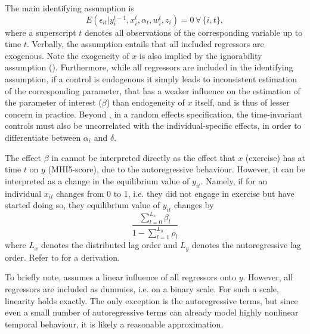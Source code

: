 The main identifying assumption is \cite{moral2019dynamic}
\begin{equation}
    \label{eq:methods:identifying_assumption}
    E(\epsilon_{it} | y_i^{t-1}, x_i^t, \alpha_t, w_{i}^t, z_i) = 0 \,\forall\,\{i,t\},
\end{equation}
where a superscript $t$ denotes all observations of the corresponding variable up to time $t$.
Verbally, the assumption entails that all included regressors are exogenous.
Note the exogeneity of $x$ is also implied by the ignorability assumption ().
Furthermore, while all regressors are included in the identifying assumption, if a control is endogenous it simply
leads to inconsistent estimation of the corresponding parameter, that has a weaker influence on the estimation
of the parameter of interest ($\beta$) than endogeneity of $x$ itself, and is thus of lesser concern in practice.
Beyond , in a random effects specification, the time-invariant controls
must also be uncorrelated with the individual-specific effects, in order to differentiate between $\alpha_i$ and $\delta$.

The effect $\beta$ in  cannot be interpreted directly as the effect that $x$ (exercise)
has at time $t$ on $y$ (MHI5-score), due to the autoregressive behaviour. However, it can be interpreted as a change
in the equilibrium value of $y_{it}$. Namely, if for an individual $x_{it}$ changes from 0 to 1, i.e. they did not
engage in exercise but have started doing so, they equilibrium value of $y_{it}$ changes by
\begin{equation}
    \label{eq:methods:long_run_effect}
    \frac{\sum_{l=0}^{L_x} \beta_l}{1 - \sum_{l=1}^{L_y} \rho_l}
\end{equation}
where $L_x$ denotes the distributed lag order and $L_y$ denotes the autoregressive lag order.
Refer to  for a derivation.

To briefly note,  assumes a linear influence of all regressors onto $y$. However, all regressors
are included as dummies, i.e. on a binary scale. For such a scale, linearity holds exactly.
The only exception is the autoregressive terms, but since even a small number of autoregressive terms can already
model highly nonlinear temporal behaviour, it is likely a reasonable approximation.

